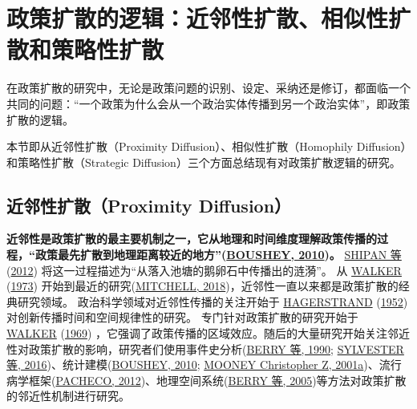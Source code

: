 \documentclass[
  12pt,
]{ctexart}
\begin{document}
\newpage

\hypertarget{ux653fux7b56ux6269ux6563ux7684ux903bux8f91ux8fd1ux90bbux6027ux6269ux6563ux76f8ux4f3cux6027ux6269ux6563ux548cux7b56ux7565ux6027ux6269ux6563}{%
\section{政策扩散的逻辑：近邻性扩散、相似性扩散和策略性扩散}\label{ux653fux7b56ux6269ux6563ux7684ux903bux8f91ux8fd1ux90bbux6027ux6269ux6563ux76f8ux4f3cux6027ux6269ux6563ux548cux7b56ux7565ux6027ux6269ux6563}}

在政策扩散的研究中，无论是政策问题的识别、设定、采纳还是修订，都面临一个共同的问题：``一个政策为什么会从一个政治实体传播到另一个政治实体''，即政策扩散的逻辑。

本节即从近邻性扩散（Proximity Diffusion）、相似性扩散（Homophily Diffusion）和策略性扩散（Strategic Diffusion）三个方面总结现有对政策扩散逻辑的研究。

\hypertarget{ux8fd1ux90bbux6027ux6269ux6563proximity-diffusion}{%
\subsection{近邻性扩散（Proximity Diffusion）}\label{ux8fd1ux90bbux6027ux6269ux6563proximity-diffusion}}

\textbf{近邻性是政策扩散的最主要机制之一，它从地理和时间维度理解政策传播的过程，``政策最先扩散到地理距离较近的地方''(\protect\hyperlink{ref-Boushey2010}{BOUSHEY, 2010})。}
\protect\hyperlink{ref-ShipanVolden2012}{SHIPAN 等} (\protect\hyperlink{ref-ShipanVolden2012}{2012}) 将这一过程描述为``从落入池塘的鹅卵石中传播出的涟漪''。
从 \protect\hyperlink{ref-Walker1973}{WALKER} (\protect\hyperlink{ref-Walker1973}{1973}) 开始到最近的研究(\protect\hyperlink{ref-Mitchell2018}{MITCHELL, 2018})，近邻性一直以来都是政策扩散的经典研究领域。
政治科学领域对近邻性传播的关注开始于 \protect\hyperlink{ref-Hagerstrand1952}{HAGERSTRAND} (\protect\hyperlink{ref-Hagerstrand1952}{1952}) 对创新传播时间和空间规律性的研究。
专门针对政策扩散的研究开始于 \protect\hyperlink{ref-Walker1969}{WALKER} (\protect\hyperlink{ref-Walker1969}{1969}) ，它强调了政策传播的区域效应。随后的大量研究开始关注邻近性对政策扩散的影响，研究者们使用事件史分析(\protect\hyperlink{ref-BerryBerry1990}{BERRY 等, 1990}; \protect\hyperlink{ref-SylvesterHaider-Markel2016}{SYLVESTER 等, 2016})、统计建模(\protect\hyperlink{ref-Boushey2010}{BOUSHEY, 2010}; \protect\hyperlink{ref-Mooney2001}{MOONEY Christopher Z, 2001a})、流行病学框架(\protect\hyperlink{ref-Pacheco2012a}{PACHECO, 2012})、地理空间系统(\protect\hyperlink{ref-BerryBaybeck2005}{BERRY 等, 2005})等方法对政策扩散的邻近性机制进行研究。
\end{document}
